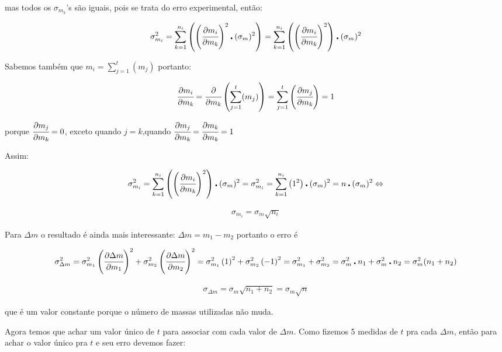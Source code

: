\documentclass[a4paper]{article}
\begin{document}
mas todos os $\sigma_{m_{k}}$'s são iguais, pois se trata do erro experimental, então:

$$\sigma_{m_{i}}^{2}={\displaystyle \sum_{k=1}^{n_{i}}\left(\left(\cfrac{\partial m_{i}}{\partial m_{k}}\right)^{2}\centerdot(\sigma_{m})^{2}\right)}={\displaystyle \sum_{k=1}^{n_{i}}\left(\left(\cfrac{\partial m_{i}}{\partial m_{k}}\right)^{2}\right)}\centerdot(\sigma_{m})^{2}$$

Sabemos também que $m_{i}={\displaystyle \sum_{j=1}^{t}(m_{j})}$ portanto:

$$\cfrac{\partial m_{i}}{\partial m_{k}}=\cfrac{\partial}{\partial m_{k}}\left({\displaystyle \sum_{j=1}^{t}(m_{j})}\right)={\displaystyle \sum_{j=1}^{t}\left(\cfrac{\partial m_{j}}{\partial m_{k}}\right)=1}$$

porque $ \cfrac{\partial m_{j}}{\partial m_{k}}=0 $, exceto quando $j=k$,quando $\cfrac{\partial m_{j}}{\partial m_{k}}=\cfrac{\partial m_{k}}{\partial m_{k}}=1$

Assim:

$$\sigma_{m_{i}}^{2}={\displaystyle \sum_{k=1}^{n_{i}}\left(\left(\cfrac{\partial m_{i}}{\partial m_{k}}\right)^{2}\right)}\centerdot(\sigma_{m})^{2}=\sigma_{m_{i}}^{2}={\displaystyle \sum_{k=1}^{n_{i}}\left(1^{2}\right)}\centerdot(\sigma_{m})^{2}={\displaystyle n}\centerdot(\sigma_{m})^{2}\Leftrightarrow$$

\begin{align}
\sigma_{m_{i}}=\sigma_{m}\sqrt{n_{i}}
\end{align}

Para $\Delta m$ o resultado é ainda mais interessante: $\Delta m=m_{1}-m_{2}$ portanto o erro é 

$$\sigma_{\Delta m}^{2}=\sigma_{m_{1}}^{2}\left(\cfrac{\partial\Delta m}{\partial m_{1}}\right)^{2}+\sigma_{m_{2}}^{2}\left(\cfrac{\partial\Delta m}{\partial m_{2}}\right)^{2}=\sigma_{m_{1}}^{2}\left(1\right)^{2}+\sigma_{m_{2}}^{2}\left(-1\right)^{2}=\sigma_{m_{1}}^{2}+\sigma_{m_{2}}^{2}=\sigma_{m}^{2}\centerdot n_{1}+\sigma_{m}^{2}\centerdot n_{2}=\sigma_{m}^{2}(n_{1}+n_{2})$$

\begin{align}
\sigma_{\Delta m}=\sigma_{m}\sqrt{n_{1}+n_{2}}=\sigma_{m}\sqrt{n}
\end{align}

que é um valor constante porque o número de massas utilizadas não muda.

Agora temos que achar um valor único de $t$ para associar com cada valor de $\Delta m$. Como fizemos 5 medidas de $t$ pra cada $\Delta m$, então para achar o valor único pra $t$ e seu erro devemos fazer:
\end{document}
